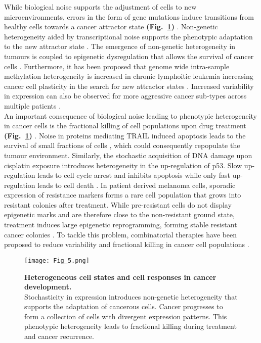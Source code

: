 While biological noise supports the adjustment of cells to new microenvironments, errors in the form of gene mutations induce transitions from healthy cells towards a cancer attractor state \textbf{(Fig.~\ref{fig0:cancer})} \citep{Marusyk2012}. 
Non-genetic heterogeneity aided by transcriptional noise supports the phenotypic adaptation to the new attractor state \citep{Jia2017}. 
The emergence of non-genetic heterogeneity in tumours is coupled to epigenetic dysregulation that allows the survival of cancer cells \citep{Timp2013}. 
Furthermore, it has been proposed that genome wide intra-sample methylation heterogeneity is increased in chronic lymphoitic leukemia increasing cancer cell plasticity in the search for new attractor states \citep{Landau2014}. 
Increased variability in expression can also be observed for more aggressive cancer sub-types across multiple patients \citep{Ecker2015}. \\

An important consequence of biological noise leading to phenotypic heterogeneity in cancer cells is the fractional killing of cell populations upon drug treatment \textbf{(Fig.~\ref{fig0:cancer})} \citep{Flusberg2015}. 
Noise in proteins mediating \Gls{TRAIL} induced apoptosis leads to the survival of small fractions of cells \citep{Spencer2009}, which could consequently repopulate the tumour environment. 
Similarly, the stochastic acquisition of DNA damage upon cisplatin exposure introduces heterogeneity in the up-regulation of p53. 
Slow up-regulation leads to cell cycle arrest and inhibits apoptosis while only fast up-regulation leads to cell death \citep{Paek2016}. 
In patient derived melanoma cells, sporadic expression of resistance markers forms a rare cell population that grows into resistant colonies after treatment. 
While pre-resistant cells do not display epigenetic marks and are therefore close to the non-resistant ground state, treatment induces large epigenetic reprogramming, forming stable resistant cancer colonies \citep{Shaffer2017}. 
To tackle this problem, combinatorial therapies have been proposed to reduce variability and fractional killing in cancer cell populations \cite{Paek2016, Roux2015}.\\

\begin{figure}[!h]
\centering
\texttt{[image: Fig\_5.png]}
\caption[Heterogeneous cell states and cell responses in cancer development]{\textbf{Heterogeneous cell states and cell responses in cancer development.}\\
Stochasticity in expression introduces non-genetic heterogeneity that supports the adaptation of cancerous cells. 
Cancer progresses to form a collection of cells with divergent expression patterns. 
This phenotypic heterogeneity leads to fractional killing during treatment and cancer recurrence.}
\label{fig0:cancer}
\end{figure}

